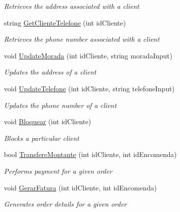 \begin{DoxyCompactItemize}
\begin{DoxyCompactList}\small\item\em Retrieves the address associated with a client \end{DoxyCompactList}\item 
string \mbox{\hyperlink{classmvc_j_j_m_s_1_1_controllers_1_1_cliente_controller_ac50b76017495e8df860bffad1e7ea29f}{Get\+Cliente\+Telefone}} (int id\+Cliente)
\begin{DoxyCompactList}\small\item\em Retrieves the phone number associated with a client \end{DoxyCompactList}\item 
void \mbox{\hyperlink{classmvc_j_j_m_s_1_1_controllers_1_1_cliente_controller_a27719253428ef9593690de0afdba5596}{Update\+Morada}} (int id\+Cliente, string morada\+Input)
\begin{DoxyCompactList}\small\item\em Updates the address of a client \end{DoxyCompactList}\item 
void \mbox{\hyperlink{classmvc_j_j_m_s_1_1_controllers_1_1_cliente_controller_aefbf9f1512ccb78afa9acaef47b95b98}{Update\+Telefone}} (int id\+Cliente, string telefone\+Input)
\begin{DoxyCompactList}\small\item\em Updates the phone number of a client \end{DoxyCompactList}\item 
void \mbox{\hyperlink{classmvc_j_j_m_s_1_1_controllers_1_1_cliente_controller_a75678bb2dcb7f48853343d9bf898d64a}{Bloquear}} (int id\+Cliente)
\begin{DoxyCompactList}\small\item\em Blocks a particular client \end{DoxyCompactList}\item 
bool \mbox{\hyperlink{classmvc_j_j_m_s_1_1_controllers_1_1_cliente_controller_a71e4b089bf6844fd8440ae4571bb6ae0}{Transfere\+Montante}} (int id\+Cliente, int id\+Encomenda)
\begin{DoxyCompactList}\small\item\em Performs payment for a given order \end{DoxyCompactList}\item 
void \mbox{\hyperlink{classmvc_j_j_m_s_1_1_controllers_1_1_cliente_controller_a626d408a5094fabc40454be45b143ab2}{Gerar\+Fatura}} (int id\+Cliente, int id\+Encomenda)
\begin{DoxyCompactList}\small\item\em Generates order details for a given order \end{DoxyCompactList}\item 

\end{DoxyCompactItemize}
